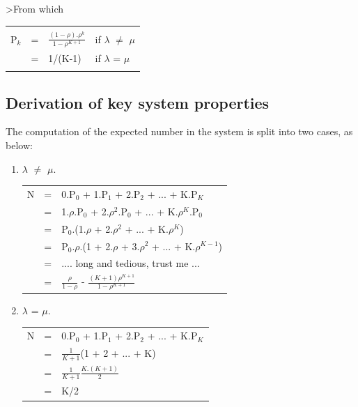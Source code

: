 \documentclass[12pt,fleqn]{report}
\begin{document}
\noindent
>From which 

\begin{tabular}{||r c l l||}
\hline
&&&\\
\hspace*{1in}
P$_k$ & = & $\frac{(1 - \rho).\rho^k}{1 - \rho^{K+1}}$
                   & if $\lambda$ $\neq$ $\mu$ \\[0.2in]
      & = & 1/(K-1)& if $\lambda$ = $\mu$ 
            \hspace*{1in} \\
&&&\\
\hline
\end{tabular}

\subsection{Derivation of key system properties}

The computation of the expected number in the system 
is split into two cases, as below:

\begin{enumerate}

\item $\lambda$ $\neq$ $\mu$.

\begin{tabular}{ l c l }
N & = & 0.P$_0$ + 1.P$_1$ + 2.P$_2$ + ... + K.P$_K$ \\
  & = & 1.$\rho$.P$_0$ + 2.$\rho^2$.P$_0$ + ... + K.$\rho^K$.P$_0$ \\
  & = & P$_0$.(1.$\rho$ + 2.$\rho^2$ + ... + K.$\rho^K$)\\
  & = & P$_0$.$\rho$.(1 + 2.$\rho$ + 3.$\rho^2$ + ... + K.$\rho^{K-1}$)\\
  & = & .... long and tedious, trust me ... \\
  & = & $\frac{\rho}{1-\rho}$ - $\frac{(K+1)\rho^{K+1}}{1-\rho^{K+1}}$\\
\end{tabular}

  
\item $\lambda$ = $\mu$.

\begin{tabular}{ l c l }
N & = & 0.P$_0$ + 1.P$_1$ + 2.P$_2$ + ... + K.P$_K$ \\
  & = & $\frac{1}{K+1}$(1 + 2 + ... + K) \\
  & = & $\frac{1}{K+1}$$\frac{K.(K+1)}{2}$\\
  & = & K/2\\
\end{tabular}

\end{enumerate}
\end{document}
